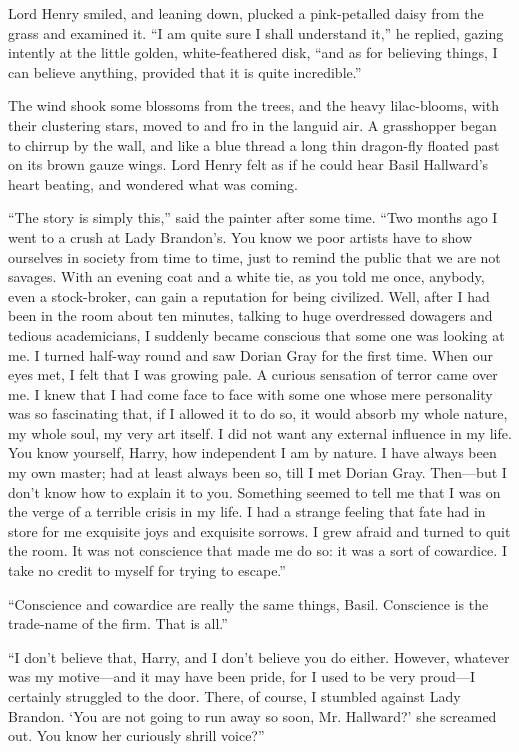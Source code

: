 Lord Henry smiled, and leaning down, plucked a pink-petalled daisy from the grass and examined it. “I am quite sure I shall understand it,” he replied, gazing intently at the little golden, white-feathered disk, “and as for believing things, I can believe anything, provided that it is quite incredible.”

The wind shook some blossoms from the trees, and the heavy lilac-blooms, with their clustering stars, moved to and fro in the languid air. A grasshopper began to chirrup by the wall, and like a blue thread a long thin dragon-fly floated past on its brown gauze wings. Lord Henry felt as if he could hear Basil Hallward’s heart beating, and wondered what was coming.

“The story is simply this,” said the painter after some time. “Two months ago I went to a crush at Lady Brandon’s. You know we poor artists have to show ourselves in society from time to time, just to remind the public that we are not savages. With an evening coat and a white tie, as you told me once, anybody, even a stock-broker, can gain a reputation for being civilized. Well, after I had been in the room about ten minutes, talking to huge overdressed dowagers and tedious academicians, I suddenly became conscious that some one was looking at me. I turned half-way round and saw Dorian Gray for the first time. When our eyes met, I felt that I was growing pale. A curious sensation of terror came over me. I knew that I had come face to face with some one whose mere personality was so fascinating that, if I allowed it to do so, it would absorb my whole nature, my whole soul, my very art itself. I did not want any external influence in my life. You know yourself, Harry, how independent I am by nature. I have always been my own master; had at least always been so, till I met Dorian Gray. Then—but I don’t know how to explain it to you. Something seemed to tell me that I was on the verge of a terrible crisis in my life. I had a strange feeling that fate had in store for me exquisite joys and exquisite sorrows. I grew afraid and turned to quit the room. It was not conscience that made me do so: it was a sort of cowardice. I take no credit to myself for trying to escape.”

“Conscience and cowardice are really the same things, Basil. Conscience is the trade-name of the firm. That is all.”

“I don’t believe that, Harry, and I don’t believe you do either. However, whatever was my motive—and it may have been pride, for I used to be very proud—I certainly struggled to the door. There, of course, I stumbled against Lady Brandon. ‘You are not going to run away so soon, Mr. Hallward?’ she screamed out. You know her curiously shrill voice?”


